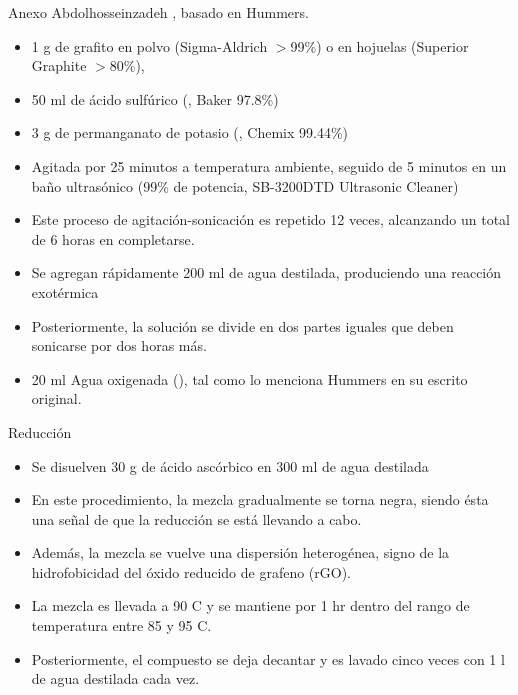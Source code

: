 \documentclass[aspectratio=169]{beamer}
\begin{document}
	\begin{frame}[allowframebreaks]{Anexo}
		 Abdolhosseinzadeh \citep{Abdolhosseinzadeh2015}, basado en Hummers.
		\begin{itemize}
			\item 1 g de grafito en polvo (Sigma-Aldrich $>$99\%) o en hojuelas (Superior Graphite $>$80\%), 
			\item 50 ml de ácido sulfúrico (, Baker 97.8\%) 
			\item 3 g de permanganato de potasio (, Chemix 99.44\%) 
			\item Agitada por 25 minutos a temperatura ambiente, seguido de 5 minutos en un baño ultrasónico (99\% de potencia, SB-3200DTD Ultrasonic Cleaner)
			\item Este proceso de agitación-sonicación es repetido 12 veces, alcanzando un total de 6 horas en completarse.
			\item Se agregan rápidamente 200 ml de agua destilada, produciendo una reacción exotérmica
			\item Posteriormente, la solución se divide en dos partes iguales que deben sonicarse por dos horas más. 
			\item 20 ml Agua oxigenada (), tal como lo menciona Hummers en su escrito original.
		\end{itemize}
		
		Reducción
		\begin{itemize}
			\item  Se disuelven 30 g de ácido ascórbico en 300 ml de agua destilada
			\item En este procedimiento, la mezcla gradualmente se torna negra, siendo ésta una señal de que la reducción se está llevando a cabo. 
			\item Además, la mezcla se vuelve una dispersión heterogénea, signo de la hidrofobicidad del óxido reducido de grafeno (rGO). 
			\item La mezcla es llevada a 90 \degree C y se mantiene por 1 hr dentro del rango de temperatura entre 85 y 95 \degree C. 
			\item Posteriormente, el compuesto se deja decantar y es lavado cinco veces con 1 l de agua destilada cada vez.
		\end{itemize}
	\end{frame}
\end{document}
